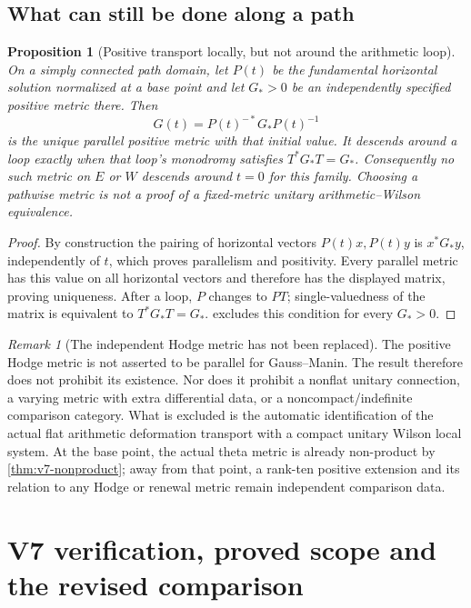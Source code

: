 \documentclass[11pt]{article}
\newtheorem{proposition}[proposition]{Proposition}
\theoremstyle{definition}
\theoremstyle{remark}
\newtheorem{remark}[remark]{Remark}
\begin{document}
\subsection{What can still be done along a path}
\begin{proposition}[Positive transport locally, but not around the arithmetic loop]
\label{prop:v7-path-metric}
On a simply connected path domain, let $P(t)$ be the fundamental horizontal
solution normalized at a base point and let $G_*>0$ be an independently
specified positive metric there. Then
\begin{equation}
 \boxed{G(t)=P(t)^{-*}G_*P(t)^{-1}}
 \label{eq:v7-parallel-metric}
\end{equation}
is the unique parallel positive metric with that initial value. It descends
around a loop exactly when that loop's monodromy satisfies
$T^*G_*T=G_*$. Consequently no such metric on $E$ or $W$ descends around
$t=0$ for this family. Choosing a pathwise metric is not a proof of a
fixed-metric unitary arithmetic--Wilson equivalence.
\end{proposition}
\begin{proof}
By construction the pairing of horizontal vectors $P(t)x,P(t)y$ is
$x^*G_*y$, independently of $t$, which proves parallelism and positivity.
Every parallel metric has this value on all horizontal vectors and therefore
has the displayed matrix, proving uniqueness. After a loop, $P$ changes to
$PT$; single-valuedness of the matrix is equivalent to $T^*G_*T=G_*$.
 excludes this condition for every $G_*>0$.
\end{proof}

\begin{remark}[The independent Hodge metric has not been replaced]
The positive Hodge metric is not asserted to be parallel for Gauss--Manin.
The result therefore does not prohibit its existence. Nor does it prohibit a
nonflat unitary connection, a varying metric with extra differential data, or
a noncompact/indefinite comparison category. What is excluded is the automatic
identification of the actual flat arithmetic deformation transport with a
compact unitary Wilson local system. At the base point, the actual theta
metric is already non-product by \cref{thm:v7-nonproduct}; away from that
point, a rank-ten positive extension and its relation to any Hodge or renewal
metric remain independent comparison data.
\end{remark}

\section{V7 verification, proved scope and the revised comparison}
\label{sec:v7-status}
\end{document}
